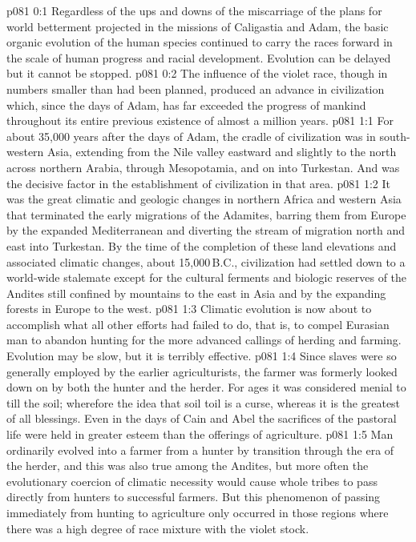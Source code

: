 \author{Archangel}
\vs p081 0:1 Regardless of the ups and downs of the miscarriage of the plans for world betterment projected in the missions of Caligastia and Adam, the basic organic evolution of the human species continued to carry the races forward in the scale of human progress and racial development. Evolution can be delayed but it cannot be stopped.
\vs p081 0:2 The influence of the violet race, though in numbers smaller than had been planned, produced an advance in civilization which, since the days of Adam, has far exceeded the progress of mankind throughout its entire previous existence of almost a million years.
\vs p081 1:1 For about 35,000 years after the days of Adam, the cradle of civilization was in south\hyp{}western Asia, extending from the Nile valley eastward and slightly to the north across northern Arabia, through Mesopotamia, and on into Turkestan. And  was the decisive factor in the establishment of civilization in that area.
\vs p081 1:2 It was the great climatic and geologic changes in northern Africa and western Asia that terminated the early migrations of the Adamites, barring them from Europe by the expanded Mediterranean and diverting the stream of migration north and east into Turkestan. By the time of the completion of these land elevations and associated climatic changes, about 15,000\,B.C., civilization had settled down to a world\hyp{}wide stalemate except for the cultural ferments and biologic reserves of the Andites still confined by mountains to the east in Asia and by the expanding forests in Europe to the west.
\vs p081 1:3 Climatic evolution is now about to accomplish what all other efforts had failed to do, that is, to compel Eurasian man to abandon hunting for the more advanced callings of herding and farming. Evolution may be slow, but it is terribly effective.
\vs p081 1:4 Since slaves were so generally employed by the earlier agriculturists, the farmer was formerly looked down on by both the hunter and the herder. For ages it was considered menial to till the soil; wherefore the idea that soil toil is a curse, whereas it is the greatest of all blessings. Even in the days of Cain and Abel the sacrifices of the pastoral life were held in greater esteem than the offerings of agriculture.
\vs p081 1:5 Man ordinarily evolved into a farmer from a hunter by transition through the era of the herder, and this was also true among the Andites, but more often the evolutionary coercion of climatic necessity would cause whole tribes to pass directly from hunters to successful farmers. But this phenomenon of passing immediately from hunting to agriculture only occurred in those regions where there was a high degree of race mixture with the violet stock.
